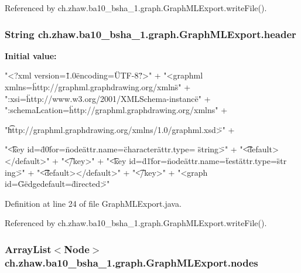 Referenced by ch.zhaw.ba10\_\-bsha\_\-1.graph.GraphMLExport.writeFile().\hypertarget{classch_1_1zhaw_1_1ba10__bsha__1_1_1graph_1_1GraphMLExport_aacda8d98c8b83e0f7cdff3bad24b8bd5}{
\subsubsection[{header}]{\setlength{\rightskip}{0pt plus 5cm}String {\bf ch.zhaw.ba10\_\-bsha\_\-1.graph.GraphMLExport.header}}}
\label{classch_1_1zhaw_1_1ba10__bsha__1_1_1graph_1_1GraphMLExport_aacda8d98c8b83e0f7cdff3bad24b8bd5}
{\bfseries Initial value:}
\begin{DoxyCode}
 "<?xml version=\"1.0\" encoding=\"UTF-8\"?>\n" +
                "<graphml xmlns=\"http://graphml.graphdrawing.org/xmlns\"\n" +
                "\txmlns:xsi=\"http://www.w3.org/2001/XMLSchema-instance\"\n" +
                "\txsi:schemaLcation=\"http://graphml.graphdrawing.org/xmlns\n" +
      
                "\t http://graphml.graphdrawing.org/xmlns/1.0/graphml.xsd\">\n" +
      
                "\t<key id=\"d0\" for=\"node\" attr.name=\"character\" attr.type=
      \"string\">\n" +
                "\t\t<default></default>\n" +
                "\t</key>\n" +
                "\t<key id=\"d1\" for=\"node\" attr.name=\"test\" attr.type=\"str
      ing\">\n" +
                "\t\t<default></default>\n" +
                "\t</key>\n" +
                "<graph id=\"G\" edgedefault=\"directed\">\n"
\end{DoxyCode}


Definition at line 24 of file GraphMLExport.java.

Referenced by ch.zhaw.ba10\_\-bsha\_\-1.graph.GraphMLExport.writeFile().\hypertarget{classch_1_1zhaw_1_1ba10__bsha__1_1_1graph_1_1GraphMLExport_a72991c26d971fa9bdcce9a1e457f3894}{
\subsubsection[{nodes}]{\setlength{\rightskip}{0pt plus 5cm}ArrayList$<${\bf Node}$>$ {\bf ch.zhaw.ba10\_\-bsha\_\-1.graph.GraphMLExport.nodes}}}
\label{classch_1_1zhaw_1_1ba10__bsha__1_1_1graph_1_1GraphMLExport_a72991c26d971fa9bdcce9a1e457f3894}


